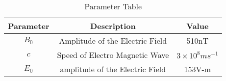 \begin{table}[H]
    \center
    \renewcommand\thetable{1}
 

\def\arraystretch{3}
\begin{adjustbox}{width=0.5\textwidth}
    \begin{tabular}{|c|c|c|}
    \hline
        \textbf{Parameter}&\textbf{Description}&\textbf{Value}\\
        \hline
        $B_0$&Amplitude of the Electric Field&510nT\\
        \hline
        $c$&Speed of Electro Magnetic Wave&$3 \times 10^8 ms^{-1}$ \\
        \hline
        $E_0$ &amplitude of the Electric Field&153V-m \\
        \hline
       \end{tabular} 
            \end{adjustbox}
    \caption{Parameter Table}

    \label{tab:12.8.7}
\end{table}


